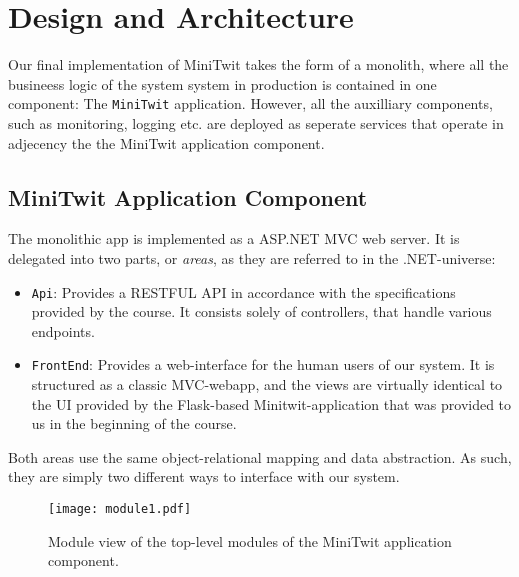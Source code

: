 \section{Design and Architecture}\label{sec:design-arch}

Our final implementation of MiniTwit takes the form of a monolith, where all the busineess logic of the system system in production is contained in one component: The \texttt{MiniTwit} application.
However, all the auxilliary components, such as monitoring, logging etc. are deployed as seperate services that operate in adjecency the the MiniTwit application component.


\subsection{MiniTwit Application Component}

The monolithic app is implemented as a ASP.NET MVC web server. It is delegated into two parts, or \textit{areas}, as they are referred to in the .NET-universe:

\begin{itemize}
	\item \texttt{Api}: Provides a RESTFUL API in accordance with the specifications provided by the course. It consists solely of controllers, that handle various endpoints.
	\item \texttt{FrontEnd}: Provides a web-interface for the human users of our system. It is structured as a classic MVC-webapp, and the views are virtually identical to the UI provided by the Flask-based Minitwit-application that was provided to us in the beginning of the course.
\end{itemize}

Both areas use the same object-relational mapping and data abstraction. As such, they are simply two different ways to interface with our system.

\begin{figure}
	\begin{center}
		\texttt{[image: module1.pdf]}
	\end{center}
	\caption{Module view of the top-level modules of the MiniTwit application component.}\label{fig:module1}
\end{figure}




